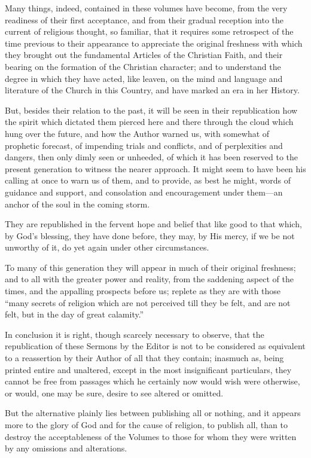 Many things, indeed, contained in these volumes have
become, from the very readiness of their first
acceptance, and from their gradual reception into the
current of religious thought, so familiar, that it
requires some retrospect of the time previous to their
appearance to appreciate the original freshness with
which they brought out the fundamental Articles of the
Christian Faith, and their bearing on the formation of
the Christian character; and to understand the degree in
which they have acted, like leaven, on the mind and
language and literature of the Church in this Country,
and have marked an era in her History.


But, besides their relation to the past, it will be
seen in their republication how the spirit which dictated
them pierced here and there through the cloud which hung
over the future, and how the Author warned us, with
somewhat of prophetic forecast, of impending trials and
conflicts, and of perplexities and dangers, then only
dimly seen or unheeded, of which it has been reserved to
the present generation to witness the nearer approach. It
might seem to have been his calling at once to warn us of
them, and to provide, as best he might, words of guidance
and support, and consolation and encouragement under them—an anchor of the soul in the coming storm.


They are republished in the fervent hope and belief
that like good to that which, by God's blessing, they
have done before, they may, by His mercy, if we be not
unworthy of it, do yet again under other circumstances.


To many of this generation they will appear in much of
their original freshness; and to all with the greater
power and reality, from the saddening aspect of the
times, and the appalling prospects before us; replete as
they are with those ``many secrets of religion which
are not perceived till they be felt, and are not felt,
but in the day of great calamity.''


In conclusion it is right, though scarcely necessary
to observe, that the republication of these Sermons by
the Editor is not to be considered as equivalent to a
reassertion by their Author of all that they contain;
inasmuch as, being printed entire and unaltered, except
in the most insignificant particulars, they cannot be
free from passages which he certainly now would wish were
otherwise, or would, one may be sure, desire to see
altered or omitted.


But the alternative plainly lies between publishing
all or nothing, and it appears more to the glory of God
and for the cause of religion, to publish all, than to
destroy the acceptableness of the Volumes to those for
whom they were written by any omissions and alterations.


